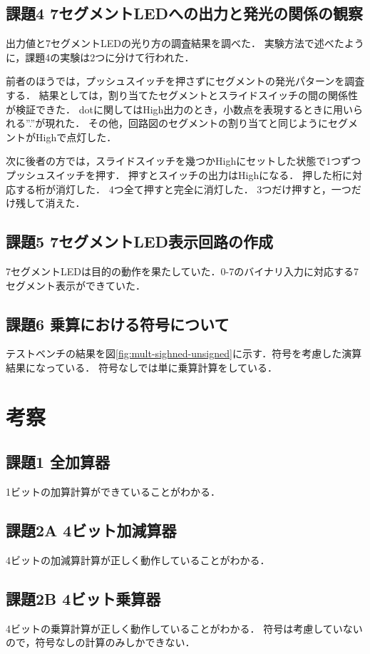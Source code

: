 \subsection{課題4 7セグメントLEDへの出力と発光の関係の観察}
出力値と7セグメントLEDの光り方の調査結果を調べた．
実験方法で述べたように，課題4の実験は2つに分けて行われた．

前者のほうでは，プッシュスイッチを押さずにセグメントの発光パターンを調査する．
結果としては，割り当てたセグメントとスライドスイッチの間の関係性が検証できた．
dotに関してはHigh出力のとき，小数点を表現するときに用いられる''.''が現れた．
その他，回路図のセグメントの割り当てと同じようにセグメントがHighで点灯した．

次に後者の方では，スライドスイッチを幾つかHighにセットした状態で1つずつプッシュスイッチを押す．
押すとスイッチの出力はHighになる．
押した桁に対応する桁が消灯した．
4つ全て押すと完全に消灯した．
3つだけ押すと，一つだけ残して消えた．

\subsection{課題5 7セグメントLED表示回路の作成}
7セグメントLEDは目的の動作を果たしていた．0-7のバイナリ入力に対応する7セグメント表示ができていた．

\subsection{課題6 乗算における符号について}
テストベンチの結果を図\ref{fig:mult-sighned-unsigned}に示す．符号を考慮した演算結果になっている．
符号なしでは単に乗算計算をしている．

\section{考察}
\subsection{課題1 全加算器}
1ビットの加算計算ができていることがわかる．

\subsection{課題2A 4ビット加減算器}
4ビットの加減算計算が正しく動作していることがわかる．

\subsection{課題2B 4ビット乗算器}
4ビットの乗算計算が正しく動作していることがわかる．
符号は考慮していないので，符号なしの計算のみしかできない．

